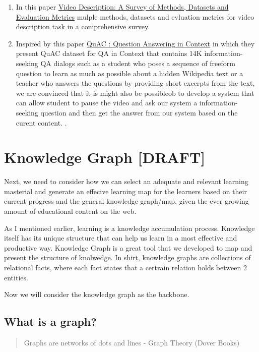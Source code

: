 \documentclass[]{book}
\theoremstyle{definition}
\theoremstyle{definition}
\theoremstyle{definition}
\theoremstyle{remark}
\begin{document}
\begin{enumerate}
\def\labelenumi{\arabic{enumi}.}
\setcounter{enumi}{4}
\item
  In this paper \href{https://arxiv.org/pdf/1806.00186.pdf}{Video
  Description: A Survey of Methods, Datasets and Evaluation Metrics}
  mulple methods, datasets and evluation metrics for video description
  task in a comprehensive survey.
\item
  Inspired by this paper
  \href{https://arxiv.org/pdf/1808.07036.pdf}{QuAC : Question Answering
  in Context} in which they present QuAC dataset for QA in Context that
  contains 14K information-seeking QA dialogs such as a student who
  poses a sequence of freeform question to learn as much as possible
  about a hidden Wikipedia text or a teacher who answers the questions
  by providing short excerpts from the text, we are convinced that it is
  might also be possibleob to develop a system that can allow student to
  pause the video and ask our system a information-seeking question and
  then get the answer from our system based on the curent content. .
\end{enumerate}

\section{Knowledge Graph {[}DRAFT{]}}\label{knowledge-graph-draft}

Next, we need to consider how we can select an adequate and relevant
learning masterial and generate an effecive learning map for the
learners based on their current progress and the general knowledge
graph/map, given the ever growing amount of educational content on the
web.

As I mentioned earlier, learning is a knowledge accumulation process.
Knowledge itself has its unique structure that can help us learn in a
most effective and productive way. Knowledge Graph is a great tool that
we developed to map and present the structure of knolwedge. In shirt,
knowledge graphs are collections of relational facts, where each fact
states that a certrain relation holds between 2 entities.

Now we will consider the knowledge graph as the backbone.

\subsection{What is a graph?}\label{what-is-a-graph}

\begin{quote}
Graphs are networks of dots and lines - Graph Theory (Dover Books)
\end{quote}
\end{document}
